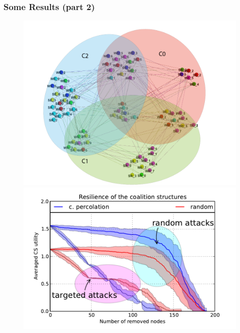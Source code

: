 \documentclass[xcolor=dvipsnames]{beamer}
\begin{document}
%
%
\begin{frame}
	\frametitle{Some Results (part 2)}
	
	\begin{figure}
		\includegraphics[scale=.15]{Overlap.png}
		\includegraphics[scale=.35]{resilience_tar_rand.pdf}
	\end{figure}
	

\end{frame}
\end{document}
